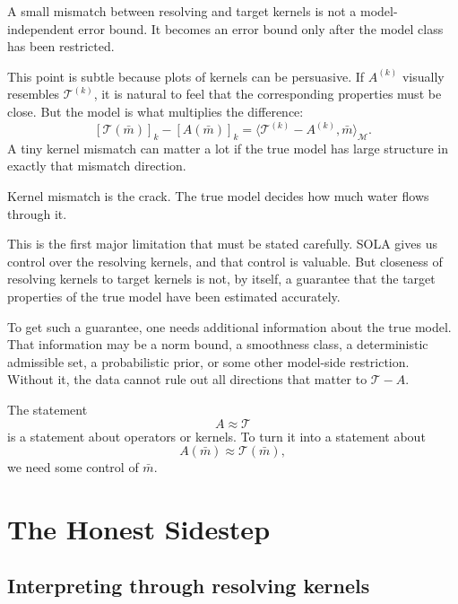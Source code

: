 \documentclass[11pt,openany]{book}
\theoremstyle{definition}
\theoremstyle{remark}
\newcommand{\M}{\mathcal M}
\newcommand{\Tau}{\mathcal{T}}
\begin{document}
\begin{warningbox}
A small mismatch between resolving and target kernels is not a model-independent error bound.
It becomes an error bound only after the model class has been restricted.
\end{warningbox}

This point is subtle because plots of kernels can be persuasive. If \(A^{(k)}\) visually resembles
\(\mathcal T^{(k)}\), it is natural to feel that the corresponding properties must be close. But
the model is what multiplies the difference:
\[
  [\Tau(\bar m)]_k-[A(\bar m)]_k
  =
  \langle \mathcal T^{(k)}-A^{(k)},\bar m\rangle_{\M}.
\]
A tiny kernel mismatch can matter a lot if the true model has large structure in exactly that
mismatch direction.

\begin{intuitionbox}
Kernel mismatch is the crack. The true model decides how much water flows through it.
\end{intuitionbox}

This is the first major limitation that must be stated carefully. SOLA gives us control over the
resolving kernels, and that control is valuable. But closeness of resolving kernels to target
kernels is not, by itself, a guarantee that the target properties of the true model have been
estimated accurately.

To get such a guarantee, one needs additional information about the true model. That information
may be a norm bound, a smoothness class, a deterministic admissible set, a probabilistic prior, or
some other model-side restriction. Without it, the data cannot rule out all directions that matter
to \(\Tau-A\).

\begin{checkpointbox}
The statement
\[
  A\approx\Tau
\]
is a statement about operators or kernels. To turn it into a statement about
\[
  A(\bar m)\approx\Tau(\bar m),
\]
we need some control of \(\bar m\).
\end{checkpointbox}

\chapter{The Honest Sidestep}

\section{Interpreting through resolving kernels}
\end{document}
